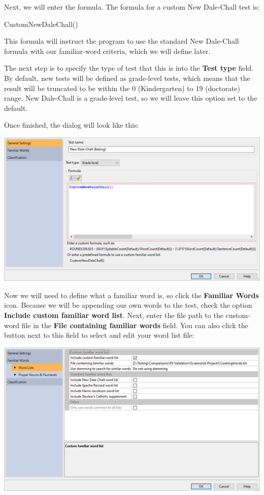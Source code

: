 \documentclass[
]{book}
\newenvironment{Shaded}{\begin{snugshade}}{\end{snugshade}}
\newcommand{\FunctionTok}[1]{\textcolor[rgb]{0.00,0.00,0.00}{#1}}
\newcommand{\NormalTok}[1]{#1}
\theoremstyle{definition}
\theoremstyle{definition}
\theoremstyle{definition}
\theoremstyle{definition}
\theoremstyle{remark}
\begin{document}
Next, we will enter the formula. The formula for a custom New Dale-Chall test is:

\begin{Shaded}
\begin{Highlighting}[]
\FunctionTok{CustomNewDaleChall}\NormalTok{()}
\end{Highlighting}
\end{Shaded}

This formula will instruct the program to use the standard New Dale-Chall formula with our familiar-word criteria, which we will define later.

The next step is to specify the type of test that this is into the \textbf{Test type} field. By default, new tests will be defined as grade-level tests, which means that the result will be truncated to be within the 0 (Kindergarten) to 19 (doctorate) range. New Dale-Chall is a grade-level test, so we will leave this option set to the default.

Once finished, the dialog will look like this:

\includegraphics{Images/CustomTestExample2FormulaFinished.png}

Now we will need to define what a familiar word is, so click the \textbf{Familiar Words} icon. Because we will be appending our own words to the test, check the option \textbf{Include custom familiar word list}. Next, enter the file path to the custom-word file in the \textbf{File containing familiar words} field. You can also click the button next to this field to select and edit your word list file:

\includegraphics{Images/CustomTestExample2WordLoaded.png}
\end{document}
